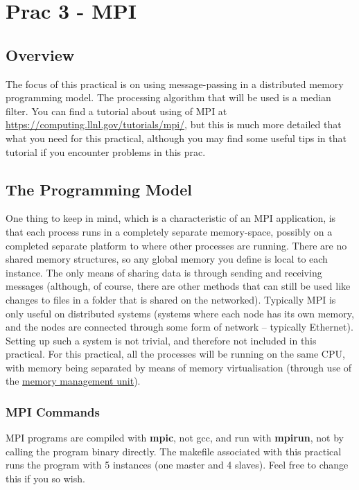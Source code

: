 \section{Prac 3 - MPI}
\label{sec:Prac3}
\subsection{Overview}
The focus of this practical is on using message-passing in a distributed memory programming model. The processing algorithm that will be used is a median filter. You can find a tutorial about using of MPI at \href{https://computing.llnl.gov/tutorials/mpi/}{https://computing.llnl.gov/tutorials/mpi/}, but this is much more detailed that what you need for this practical, although you may find some useful tips in that tutorial if you encounter problems in this prac.

\subsection{The Programming Model}
One thing to keep in mind, which is a characteristic of an MPI application, is that each process runs in a completely separate memory-space, possibly on a completed separate platform to where other processes are running.
There are no shared memory structures, so any global memory you define is local to each
instance. The only means of sharing data is through sending and receiving messages (although, of course, there are other methods that can still be used like changes to files in a folder that is shared on the networked).
Typically MPI is only useful on distributed systems (systems where each node has its own
memory, and the nodes are connected through some form of network – typically Ethernet).
Setting up such a system is not trivial, and therefore not included in this practical. For this
practical, all the processes will be running on the same CPU, with memory being separated
by means of memory virtualisation (through use of the \href{https://en.wikipedia.org/wiki/Memory_management_unit}{memory management unit}).

\subsubsection{MPI Commands}
MPI programs are compiled with \textbf{mpic}, not gcc, and run with \textbf{mpirun}, not by calling the program binary directly. The makefile associated with this practical runs the program with 5 instances (one master and 4 slaves). Feel free to change this if you so wish. 

